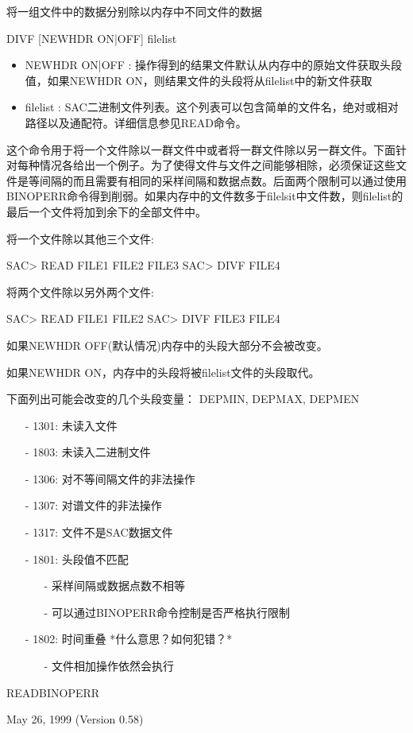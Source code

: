 \label{cmd:divf}

将一组文件中的数据分别除以内存中不同文件的数据

DIVF [NEWHDR ON|OFF] filelist

\begin{itemize}
\item NEWHDR ON|OFF : 操作得到的结果文件默认从内存中的原始文件获取头段值，如果NEWHDR ON，则结果文件的头段将从filelist中的新文件获取 
\item filelist : SAC二进制文件列表。这个列表可以包含简单的文件名，绝对或相对路径以及通配符。详细信息参见READ命令。
\end{itemize}

这个命令用于将一个文件除以一群文件中或者将一群文件除以另一群文件。下面针对每种情况各给出一个例子。为了使得文件与文件之间能够相除，必须保证这些文件是等间隔的而且需要有相同的采样间隔和数据点数。后面两个限制可以通过使用BINOPERR命令得到削弱。如果内存中的文件数多于filelsit中文件数，则filelist的最后一个文件将加到余下的全部文件中。

将一个文件除以其他三个文件:
\begin{SACCode}
SAC> READ FILE1 FILE2 FILE3
SAC> DIVF FILE4
\end{SACCode}
将两个文件除以另外两个文件:
\begin{SACCode}
SAC> READ FILE1 FILE2
SAC> DIVF FILE3 FILE4
\end{SACCode}

如果NEWHDR OFF(默认情况)内存中的头段大部分不会被改变。

如果NEWHDR ON，内存中的头段将被filelist文件的头段取代。

下面列出可能会改变的几个头段变量：
DEPMIN, DEPMAX, DEPMEN

\begin{itemize}
\item[-]1301: 未读入文件
\item[-]1803: 未读入二进制文件
\item[-]1306: 对不等间隔文件的非法操作
\item[-]1307: 对谱文件的非法操作
\item[-]1317: 文件不是SAC数据文件
\item[-]1801: 头段值不匹配
	\begin{itemize}
	\item[-]采样间隔或数据点数不相等
	\item[-]可以通过BINOPERR命令控制是否严格执行限制
	\end{itemize}
\end{itemize}

\begin{itemize}
\item[-]1802: 时间重叠  *什么意思？如何犯错？*
	\begin{itemize}
	\item[-]文件相加操作依然会执行
	\end{itemize}
\end{itemize}

READBINOPERR

May 26, 1999 (Version 0.58)
